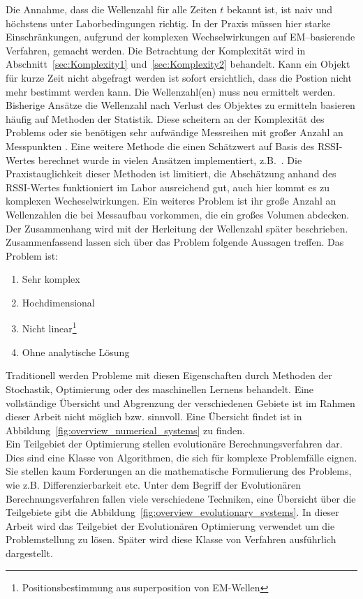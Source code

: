 Die Annahme, dass die Wellenzahl für alle Zeiten $t$ bekannt ist, ist naiv und höchstens unter Laborbedingungen richtig. In der Praxis müssen hier starke Einschränkungen, aufgrund der komplexen Wechselwirkungen auf EM--basierende Verfahren, gemacht werden. Die Betrachtung der Komplexität wird in Abschnitt~\ref{sec:Komplexity1} und~\ref{sec:Komplexity2} behandelt. Kann ein Objekt für kurze Zeit nicht abgefragt werden ist sofort ersichtlich, dass die Postion nicht mehr bestimmt werden kann. Die Wellenzahl(en) muss neu ermittelt werden.\\ 
%

Bisherige Ansätze die Wellenzahl nach Verlust des Objektes zu ermitteln basieren häufig auf Methoden der Statistik. Diese scheitern an der Komplexität des Problems oder sie benötigen sehr aufwändige Messreihen mit großer Anzahl an Messpunkten \cite{amedo1}. Eine weitere Methode die einen Schätzwert auf Basis des RSSI-Wertes berechnet wurde in vielen Ansätzen implementiert, z.B.~\cite{KALMANandSMOOTHING}. Die Praxistauglichkeit dieser Methoden ist limitiert, die Abschätzung anhand des RSSI-Wertes funktioniert im Labor ausreichend gut, auch hier kommt es zu komplexen Wecheselwirkungen. Ein weiteres Problem ist ihr große Anzahl an Wellenzahlen die bei Messaufbau vorkommen, die ein großes Volumen abdecken. Der Zusammenhang wird mit der Herleitung der Wellenzahl später beschrieben.\\
%

Zusammenfassend lassen sich über das Problem folgende Aussagen treffen. Das Problem ist: 
%
\begin{enumerate}[itemsep=0mm]
	\item Sehr komplex
	\item Hochdimensional
	\item Nicht linear\footnote{Positionsbestimmung aus superposition von EM-Wellen}
	\item Ohne analytische Lösung
\end{enumerate}
%

Traditionell werden Probleme mit diesen Eigenschaften durch Methoden der Stochastik, Optimierung oder des maschinellen Lernens behandelt. Eine vollständige Übersicht und Abgrenzung der verschiedenen Gebiete ist im Rahmen dieser Arbeit nicht möglich bzw. sinnvoll. Eine Übersicht findet ist in Abbildung~\ref{fig:overview_numerical_systems} zu finden.\\
%

Ein Teilgebiet der Optimierung stellen evolutionäre Berechnungsverfahren dar. Dies sind eine Klasse von Algorithmen, die sich für komplexe Problemfälle eignen. Sie stellen kaum Forderungen an die mathematische Formulierung des Problems, wie z.B. Differenzierbarkeit etc. Unter dem Begriff der Evolutionären Berechnungsverfahren fallen viele verschiedene Techniken, eine Übersicht über die Teilgebiete gibt die Abbildung~\ref{fig:overview_evolutionary_systems}. In dieser Arbeit wird das Teilgebiet der Evolutionären Optimierung verwendet um die Problemstellung zu lösen. Später wird diese Klasse von Verfahren ausführlich dargestellt.
%

